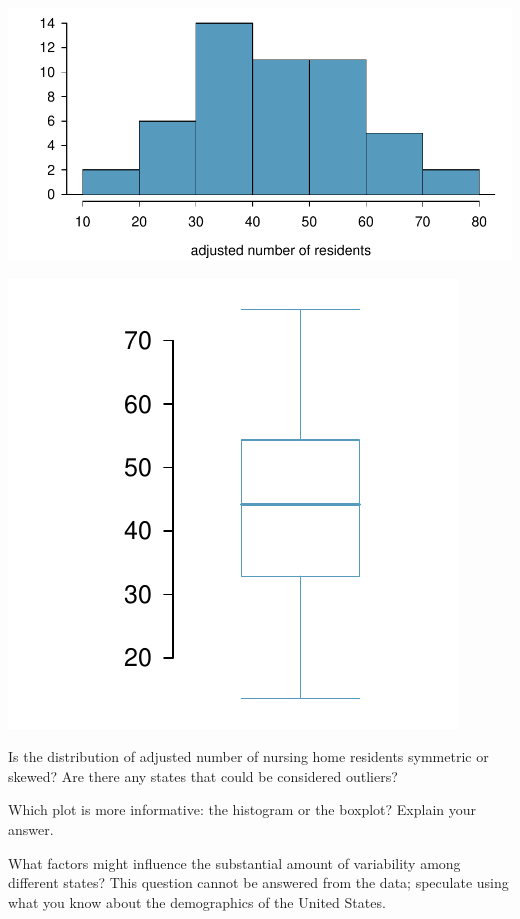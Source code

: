 {\begin{minipage}[c]{0.55\textwidth}
\begin{center}
	\includegraphics[width = \textwidth]{ch_intro_to_data_oi_biostat/figures/eoce/nursing_home/nursing_home_hist.pdf} 
\end{center}	
\end{minipage}
\begin{minipage}[c]{0.45\textwidth}
\begin{center}
	\includegraphics[width = \textwidth]{ch_intro_to_data_oi_biostat/figures/eoce/nursing_home/nursing_home_boxplot.pdf} 
\end{center}	
\end{minipage}
\begin{parts}
\item Is the distribution of adjusted number of nursing home residents symmetric or skewed? Are there any states that could be considered outliers?

\item Which plot is more informative: the histogram or the boxplot? Explain your answer.

\item What factors might influence the substantial amount of variability among different states? This question cannot be answered from the data; speculate using what you know about the demographics of the United States.
\end{parts}
}{}

